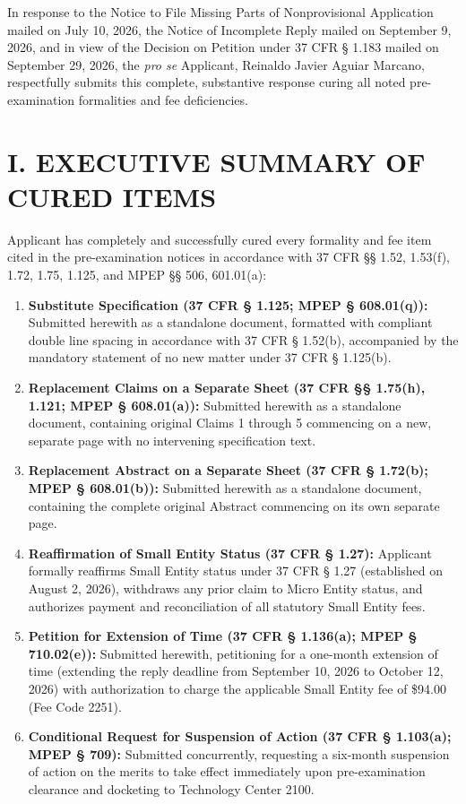 \documentclass[11pt,letterpaper]{article}
\begin{document}
\noindent In response to the Notice to File Missing Parts of Nonprovisional Application mailed on July 10, 2026, the Notice of Incomplete Reply mailed on September 9, 2026, and in view of the Decision on Petition under 37 CFR \S{} 1.183 mailed on September 29, 2026, the \textit{pro se} Applicant, Reinaldo Javier Aguiar Marcano, respectfully submits this complete, substantive response curing all noted pre-examination formalities and fee deficiencies.

\section*{I. EXECUTIVE SUMMARY OF CURED ITEMS}

Applicant has completely and successfully cured every formality and fee item cited in the pre-examination notices in accordance with 37 CFR \S\S{} 1.52, 1.53(f), 1.72, 1.75, 1.125, and MPEP \S\S{} 506, 601.01(a):

\begin{enumerate}[leftmargin=2em, itemsep=3pt, parsep=0pt]
    \item \textbf{Substitute Specification (37 CFR \S{} 1.125; MPEP \S{} 608.01(q)):} Submitted herewith as a standalone document, formatted with compliant double line spacing in accordance with 37 CFR \S{} 1.52(b), accompanied by the mandatory statement of no new matter under 37 CFR \S{} 1.125(b).
    \item \textbf{Replacement Claims on a Separate Sheet (37 CFR \S\S{} 1.75(h), 1.121; MPEP \S{} 608.01(a)):} Submitted herewith as a standalone document, containing original Claims 1 through 5 commencing on a new, separate page with no intervening specification text.
    \item \textbf{Replacement Abstract on a Separate Sheet (37 CFR \S{} 1.72(b); MPEP \S{} 608.01(b)):} Submitted herewith as a standalone document, containing the complete original Abstract commencing on its own separate page.
    \item \textbf{Reaffirmation of Small Entity Status (37 CFR \S{} 1.27):} Applicant formally reaffirms Small Entity status under 37 CFR \S{} 1.27 (established on August 2, 2026), withdraws any prior claim to Micro Entity status, and authorizes payment and reconciliation of all statutory Small Entity fees.
    \item \textbf{Petition for Extension of Time (37 CFR \S{} 1.136(a); MPEP \S{} 710.02(e)):} Submitted herewith, petitioning for a one-month extension of time (extending the reply deadline from September 10, 2026 to October 12, 2026) with authorization to charge the applicable Small Entity fee of \$94.00 (Fee Code 2251).
    \item \textbf{Conditional Request for Suspension of Action (37 CFR \S{} 1.103(a); MPEP \S{} 709):} Submitted concurrently, requesting a six-month suspension of action on the merits to take effect immediately upon pre-examination clearance and docketing to Technology Center 2100.
\end{enumerate}
\end{document}
